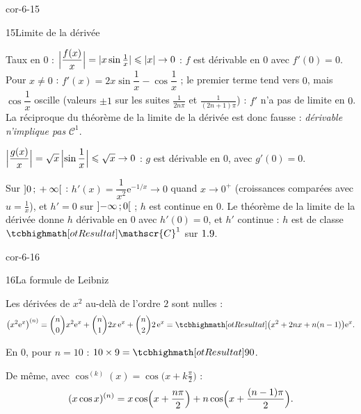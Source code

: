 \begin{blocLivre}{cor-6-15}
\begin{corrige}{15}{Limite de la dérivée}
\begin{questions}
  \item Taux en $0$ : $\Bigl|\dfrac{f(x)}{x}\Bigr|=|x\sin\frac1x|\leq|x|\to0$ :
    $f$ est dérivable en $0$ avec $f'(0)=0$. Pour $x\neq0$ :
    $f'(x)=2x\sin\dfrac1x-\cos\dfrac1x$ ; le premier terme tend vers $0$,
    mais $\cos\dfrac1x$ oscille (valeurs $\pm1$ sur les suites
    $\frac{1}{2n\pi}$ et $\frac{1}{(2n+1)\pi}$) : $f'$ n'a pas de limite en
    $0$. La réciproque du théorème de la limite de la dérivée est donc
    fausse : \emph{dérivable n'implique pas} $\mathscr{C}^{1}$.
  \item $\Bigl|\dfrac{g(x)}{x}\Bigr|=\sqrt x\,\Bigl|\sin\dfrac1x\Bigr|\leq\sqrt x\to0$ :
    $g$ est dérivable en $0$, avec $g'(0)=0$.
  \item Sur $\intOO{0}{+\infty}$ : $h'(x)=\dfrac{1}{x^{2}}\mathrm{e}^{-1/x}\to0$
    quand $x\to0^{+}$ (croissances comparées avec $u=\frac1x$), et $h'=0$
    sur $\intOO{-\infty}{0}$ ; $h$ est continue en $0$. Le théorème de la
    limite de la dérivée donne $h$ dérivable en $0$ avec $h'(0)=0$, et $h'$
    continue : $h$ est de classe $\res{\mathscr{C}^{1}}$ sur $\R$.
\end{questions}
\end{corrige}
\end{blocLivre}

\begin{blocLivre}{cor-6-16}
\begin{corrige}{16}{La formule de Leibniz}
\begin{questions}
  \item Les dérivées de $x^{2}$ au-delà de l'ordre $2$ sont nulles :
    \[
      \bigl(x^{2}\mathrm{e}^{x}\bigr)^{(n)}
      =\binom{n}{0}x^{2}\mathrm{e}^{x}+\binom{n}{1}2x\,\mathrm{e}^{x}+\binom{n}{2}2\,\mathrm{e}^{x}
      =\res{\bigl(x^{2}+2nx+n(n-1)\bigr)\mathrm{e}^{x}}.
    \]
  \item En $0$, pour $n=10$ : $10\times9=\res{90}$.
  \item De même, avec $\cos^{(k)}(x)=\cos\bigl(x+k\frac{\pi}{2}\bigr)$ :
    \[
      (x\cos x)^{(n)}=x\cos\Bigl(x+\frac{n\pi}{2}\Bigr)
      +n\cos\Bigl(x+\frac{(n-1)\pi}{2}\Bigr).
    \]
\end{questions}
\end{corrige}
\end{blocLivre}


